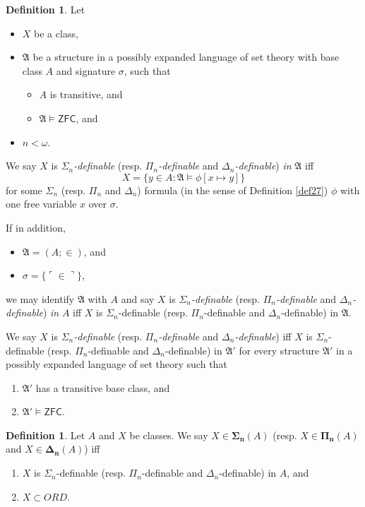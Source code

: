\documentclass[12pt, twoside]{memoir}
\numberwithin{equation}{section}
\theoremstyle{definition}
\newtheorem{defi}[thm]{Definition}
\theoremstyle{remark}
\theoremstyle{definition}
\theoremstyle{definition}
\theoremstyle{definition}
\theoremstyle{remark}
\begin{document}
\begin{defi}
Let 
\begin{itemize}
    \item $X$ be a class, 
    \item $\mathfrak{A}$ be a structure in a possibly expanded language of set theory with base class $A$ and signature $\sigma$, such that 
    \begin{itemize}[label=$\circ$]
        \item $A$ is transitive, and
        \item $\mathfrak{A} \models \mathsf{ZFC}$, and
    \end{itemize}
    \item $n < \omega$.
\end{itemize}
We say $X$ is $\Sigma_n$\emph{-definable} (resp. $\Pi_n$\emph{-definable} and $\Delta_n$\emph{-definable}) \emph{in} $\mathfrak{A}$ iff $$X = \{y \in A : \mathfrak{A} \models \phi[x \mapsto y]\}$$ for some $\Sigma_n$ (resp. $\Pi_n$ and $\Delta_n$) formula (in the sense of Definition \ref{def27}) $\phi$ with one free variable $x$ over $\sigma$.

If in addition,
\begin{itemize}
    \item $\mathfrak{A} = (A; \in)$, and
    \item $\sigma = \{\ulcorner \in \urcorner\}$,
\end{itemize}
we may identify $\mathfrak{A}$ with $A$ and say $X$ is $\Sigma_n$\emph{-definable} (resp. $\Pi_n$\emph{-definable} and $\Delta_n$\emph{-definable}) \emph{in} $A$ iff $X$ is $\Sigma_n$-definable (resp. $\Pi_n$-definable and $\Delta_n$-definable) in $\mathfrak{A}$. 

We say $X$ is $\Sigma_n$\emph{-definable} (resp. $\Pi_n$\emph{-definable} and $\Delta_n$\emph{-definable}) iff $X$ is $\Sigma_n$-definable (resp. $\Pi_n$-definable and $\Delta_n$-definable) in $\mathfrak{A}'$ for every structure $\mathfrak{A}'$ in a possibly expanded language of set theory such that
\begin{enumerate}[label=(\alph*)]
    \item $\mathfrak{A}'$ has a transitive base class, and
    \item $\mathfrak{A}' \models \mathsf{ZFC}$.
\end{enumerate}
\end{defi}

\begin{defi}
Let $A$ and $X$ be classes. We say $X \in \mathbf{\Sigma_n}(A)$ (resp. $X \in \mathbf{\Pi_n}(A)$ and $X \in \mathbf{\Delta_n}(A)$) iff
\begin{enumerate}[label=(\alph*)]
    \item $X$ is $\Sigma_n$-definable (resp. $\Pi_n$-definable and $\Delta_n$-definable) in $A$, and
    \item $X \subset ORD$.
\end{enumerate}
\end{defi}
\end{document}
